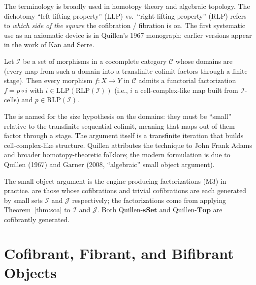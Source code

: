 \begin{nameorigin}
The  terminology is broadly used in homotopy
theory and algebraic topology. The dichotomy ``left lifting property''
(LLP) vs.\ ``right lifting property'' (RLP) refers to \emph{which side
of the square} the cofibration / fibration is on. The first systematic
use as an axiomatic device is in Quillen's 1967 monograph; earlier
versions appear in the work of Kan and Serre.
\end{nameorigin}

\begin{theorem}
\label{thm:soa}
Let $\mathcal{I}$ be a set of morphisms in a cocomplete category
$\mathcal{C}$ whose domains are  (every map from such a domain
into a transfinite colimit factors through a finite stage). Then every
morphism $f : X \to Y$ in $\mathcal{C}$ admits a functorial factorization
$f = p \circ i$ with $i \in \mathrm{LLP}(\mathrm{RLP}(\mathcal{I}))$
(i.e., $i$ a cell-complex-like map built from $\mathcal{I}$-cells) and
$p \in \mathrm{RLP}(\mathcal{I})$.
\end{theorem}

\begin{nameorigin}
The  is named for the size hypothesis on the
domains: they must be ``small'' relative to the transfinite sequential
colimit, meaning that maps out of them factor through a stage. The
argument itself is a transfinite iteration that builds cell-complex-like
structure. Quillen attributes the technique to John Frank Adams and
broader homotopy-theoretic folklore; the modern formulation is due to
Quillen (1967) and Garner (2008, ``algebraic'' small object argument).
\end{nameorigin}

\begin{remark}
The small object argument is the engine producing factorizations (M3) in
practice.  are those whose
cofibrations and trivial cofibrations are each generated by small sets
$\mathcal{I}$ and $\mathcal{J}$ respectively; the factorizations come
from applying Theorem~\ref{thm:soa} to $\mathcal{I}$ and $\mathcal{J}$.
Both Quillen-$\mathbf{sSet}$ and Quillen-$\mathbf{Top}$ are cofibrantly
generated.
\end{remark}


\section{Cofibrant, Fibrant, and Bifibrant Objects}
\label{sec:cofibrant-fibrant}

